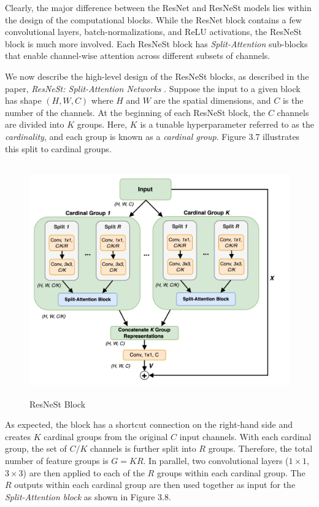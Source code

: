 \documentclass [MAS] {uclathes}
\begin{document}
Clearly, the major difference between the ResNet and ResNeSt models lies within the design of the computational blocks. While the ResNet block contains a few convolutional layers, batch-normalizations, and ReLU activations, the ResNeSt block is much more involved. Each ResNeSt block has \textit{Split-Attention} sub-blocks that enable channel-wise attention across different subsets of channels. 

We now describe the high-level design of the ResNeSt blocks, as described in the paper, \textit{ResNeSt: Split-Attention Networks} \cite{resnest}. Suppose the input to a given block has shape $(H, W, C)$ where $H$ and $W$ are the spatial dimensions, and $C$ is the number of the channels. At the beginning of each ResNeSt block, the $C$ channels are divided into $K$ groups. Here, $K$ is a tunable hyperparameter referred to as the \textit{cardinality}, and each group is known as a \textit{cardinal group}. Figure 3.7 illustrates this split to cardinal groups.

\begin{figure}[h]
\centering
\includegraphics[height = 100mm, width= 130mm]{imgs/resnest_block.png}
\caption{ResNeSt Block}
\label{fig:resnest_block}
\end{figure}

As expected, the block has a shortcut connection on the right-hand side and creates $K$ cardinal groups from the original $C$ input channels. With each cardinal group, the set of $C/K$ channels is further split into $R$ groups. Therefore, the total number of feature groups is $G = KR$. In parallel, two convolutional layers ($1 \times 1$, $3 \times 3$) are then applied to each of the $R$ groups within each cardinal group. The $R$ outputs within each cardinal group are then used together as input for the \textit{Split-Attention block} as shown in Figure 3.8.
\end{document}
